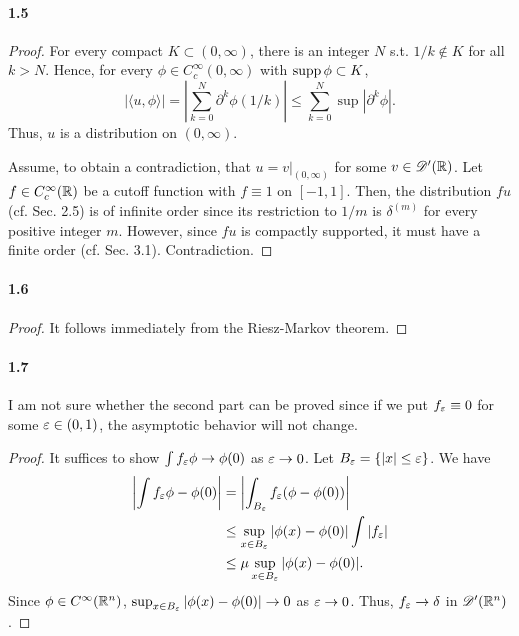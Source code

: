 \paragraph{1.5}
\begin{proof}
  For every compact $K \subset (0, \infty)$, there is an integer $N$ s.t. 
  $1/k \notin K$ for all $k > N$. Hence, for every $\phi \in C^\infty_c(0,
  \infty)$ with $\operatorname{supp} \phi \subset K$, 
  \[
    |\langle u, \phi\rangle| 
    = \left|\sum_{k=0}^N \partial^k \phi(1/k)\right|
    \le \sum_{k=0}^N \sup|\partial^k \phi|.
  \]
  Thus, $u$ is a distribution on $(0, \infty)$. 
  
  Assume, to obtain a contradiction, that $u = v|_{(0, \infty)}$ for some 
  $v \in \mathscr{D}^\prime(\mathbb{R})$. Let $f \in C^\infty_c(\mathbb{R})$ be a cutoff function
  with $f \equiv 1$ on $[-1, 1]$. Then, the distribution $fu$ (cf. Sec. 2.5)
  is of infinite order since its restriction to $1/m$ is $\delta^{(m)}$ for
  every positive integer $m$. However, since $fu$ is compactly supported, it
  must have a finite order (cf. Sec. 3.1). Contradiction. 
\end{proof}

\paragraph{1.6}
\begin{proof}
  It follows immediately from the Riesz-Markov theorem.
\end{proof}

\paragraph{1.7}
  I am not sure whether the second part can be proved since if we put
  $f_\varepsilon \equiv 0$ for some $\varepsilon \in (0, 1)$, the asymptotic behavior will
  not change.
\begin{proof}
  It suffices to show $\int f_\varepsilon\phi \to \phi(0)$ as $\varepsilon\to 0$. Let 
  $B_\varepsilon = \{|x| \le \varepsilon\}$. We have
  \begin{align*}
    \left|\int f_\varepsilon \phi - \phi(0)\right|
    &= \left|\int_{B_\varepsilon} f_\varepsilon (\phi - \phi(0)) \right| \\
    &\le \sup_{x \in B_\varepsilon}|\phi(x) - \phi(0)| \int|f_\varepsilon| \\
    &\le \mu\sup_{x \in B_\varepsilon}|\phi(x) - \phi(0)| .
  \end{align*}
  Since $\phi\in C^\infty(\mathbb{R}^n)$, $\sup_{x\in B_\varepsilon}|\phi(x) - \phi(0)|
  \to 0$ as $\varepsilon \to 0$. Thus, $f_\varepsilon \to \delta$ in $\mathscr{D}^\prime(\mathbb{R}^n)$.
\end{proof}

